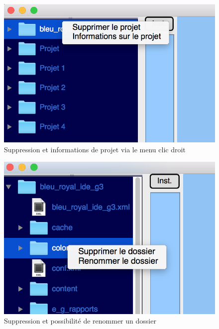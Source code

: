 \documentclass[a4paper,12pt]{article}
\begin{document}
\begin{figure}[h!]
			\begin{center}
				\includegraphics[scale=0.5]{images/imgs_projet/right_click_project.png}
				\caption{Suppression et informations de projet via le menu clic droit}
			\end{center}
		\end{figure}
		
\begin{figure}[h!]
			\begin{center}
				\includegraphics[scale=0.5]{images/imgs_projet/right-click-dir.png}
				\caption{Suppression et possibilité de renommer un dossier}
			\end{center}
		\end{figure}
		
\end{document}
